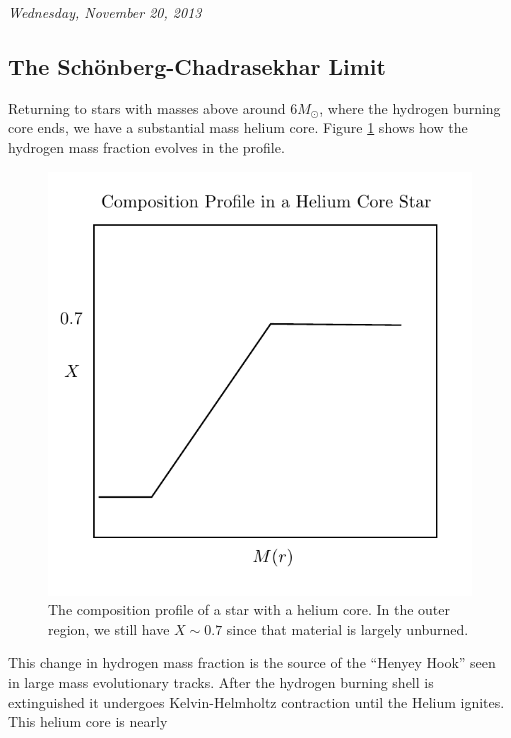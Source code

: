 \documentclass[10pt]{article}
\numberwithin{equation}{section}
\newcommand{\n}{\noindent}
\newcommand{\figref}[1]{Figure \ref{#1}}
\begin{document}
    \n \textit{Wednesday, November 20, 2013}

    \subsection{The Sch\"onberg-Chadrasekhar Limit}
    \label{sec:schonb-chadr-limit}

    Returning to stars with masses above around $6M_\odot$, where the
    hydrogen burning core ends, we have a substantial mass helium
    core. \figref{fig:3} shows how the hydrogen mass fraction evolves
    in the profile.\\

    \begin{figure}[h!]
      \centering
      \includegraphics{compPlot.pdf}
      \caption{The composition profile of a star with a helium
        core. In the outer region, we still have $X\sim 0.7$ since
        that material is largely unburned.}
      \label{fig:3}
    \end{figure}
    \n This change in hydrogen mass fraction is the source of the
    ``Henyey Hook'' seen in large mass evolutionary tracks. After the
    hydrogen burning shell is extinguished it undergoes Kelvin-Helmholtz
    contraction until the Helium ignites. This helium core is nearly
\end{document}
